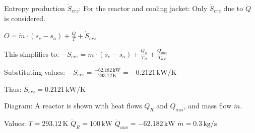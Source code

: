 Entropy production \( \dot{S}_{erz} \):  
For the reactor and cooling jacket:  
Only \( \dot{S}_{erz} \) due to \( \dot{Q} \) is considered.  

\( O = \dot{m} \cdot (s_e - s_a) + \frac{\dot{Q}}{T} + \dot{S}_{erz} \)  

This simplifies to:  
\( -\dot{S}_{erz} = \dot{m} \cdot (s_e - s_a) + \frac{\dot{Q}_R}{T_R} + \frac{\dot{Q}_{aus}}{T_{KF}} \)  

Substituting values:  
\( -\dot{S}_{erz} = \frac{-62.182 \, \text{kW}}{293.12 \, \text{K}} = -0.2121 \, \text{kW/K} \)  

Thus:  
\( \dot{S}_{erz} = 0.2121 \, \text{kW/K} \)  

Diagram:  
A reactor is shown with heat flows \( Q_R \) and \( Q_{aus} \), and mass flow \( \dot{m} \).  

Values:  
\( T = 293.12 \, \text{K} \)  
\( \dot{Q}_R = 100 \, \text{kW} \)  
\( \dot{Q}_{aus} = -62.182 \, \text{kW} \)  
\( \dot{m} = 0.3 \, \text{kg/s} \)